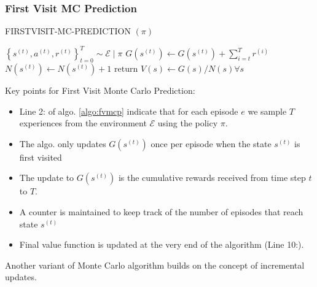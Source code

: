 \documentclass[11pt]{article}
\begin{document}
\subsubsection* {First Visit MC Prediction}
\begin{algorithm}[H]
\caption{FIRSTVISIT-MC-PREDICTION $(\pi)$}
\label{algo:fvmcp}
\begin{algorithmic}[1]
\STATE $\left\{s^{(t)}, a^{(t)}, r^{(t)}\right\}_{t=0}^{T} \sim \mathcal{E} \mid \pi$
\STATE $G\left(s^{(t)}\right) \leftarrow G\left(s^{(t)}\right)+\sum_{i=t}^{T} r^{(i)}$
\STATE $N\left(s^{(t)}\right) \leftarrow N\left(s^{(t)}\right)+1$
\ENDIF
\ENDFOR
\ENDFOR
\STATE $\text{return } V(s) \leftarrow G(s) / N(s) \forall s$
\end{algorithmic}
\end{algorithm}
Key points for First Visit Monte Carlo Prediction:
\begin{itemize}
    \item Line 2: of algo. \ref{algo:fvmcp} indicate that for each episode $e$ we sample $T$ experiences from the environment $\mathcal{E}$ using the policy $\pi$. 
    \item The algo. only updates $G(s^{(t)})$ once per episode when the state $s^{(t)}$ is first visited
    \item The update to $G(s^{(t)})$ is the cumulative rewards received from time step $t$ to $T$.
    \item A counter is maintained to keep track of the number of episodes that reach state $s^{(t)}$
    \item Final value function is updated at the very end of the algorithm (Line 10:).
\end{itemize}
Another variant of Monte Carlo algorithm builds on the concept of incremental updates.
\end{document}

